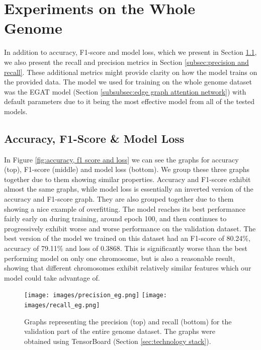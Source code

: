 \documentclass[times, utf8, diplomski, english]{fer_eng}
\begin{document}
\section{Experiments on the Whole Genome}
\label{sec:experiments on the whole genome}

In addition to accuracy, F1-score and model loss, which we present in Section \ref{subsec:accuracy, f1-score and model loss}, we also present the recall and precision metrics in Section \ref{subsec:precision and recall}. These additional metrics might provide clarity on how the model trains on the provided data. The model we used for training on the whole genome dataset was the EGAT model (Section \ref{subsubsec:edge graph attention network}) with default parameters due to it being the most effective model from all of the tested models.

\subsection{Accuracy, F1-Score \& Model Loss}
\label{subsec:accuracy, f1-score and model loss}

In Figure \ref{fig:accuracy, f1 score and loss} we can see the graphs for accuracy (top), F1-score (middle) and model loss (bottom). We group these three graphs together due to them showing similar properties. Accuracy and F1-score exhibit almost the same graphs, while model loss is essentially an inverted version of the accuracy and F1-score graph. They are also grouped together due to them showing a nice example of overfitting. The model reaches its best performance fairly early on during training, around epoch 100, and then continues to progressively exhibit worse and worse performance on the validation dataset. The best version of the model we trained on this dataset had an F1-score of 80.24\%, accuracy of 79.11\% and loss of 0.3868. This is significantly worse than the best performing model on only one chromosome, but is also a reasonable result, showing that different chromosomes exhibit relatively similar features which our model could take advantage of.

\begin{figure}[h]
	\centering
	\texttt{[image: images/precision\_eg.png]}
	\texttt{[image: images/recall\_eg.png]}
	\caption[Precision and recall graph]{Graphs representing the precision (top) and recall (bottom) for the validation part of the entire genome dataset. The graphs were obtained using TensorBoard (Section \ref{sec:technology stack}).}
	\label{fig:precision and recall}
\end{figure}
\end{document}
